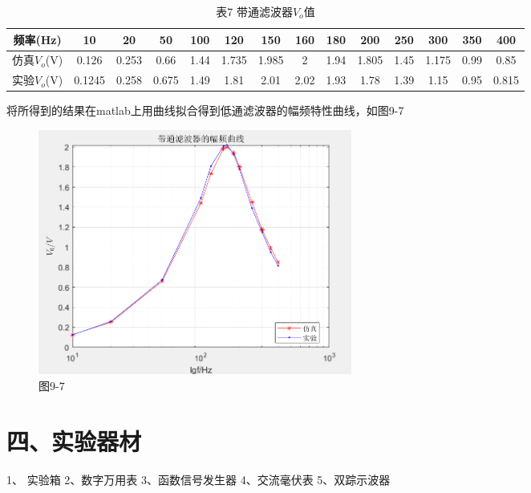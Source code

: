 \documentclass[a4paper,10pt,notitlepage]{article}
\begin{document}
\begin{enumerate}
\begin{table}[h]
\begin{tabular}{|c|c|c|c|c|c|c|c|c|c|c|c|c|c|}
			\hline
			频率(Hz) & 10 & 20 & 50 & 100 & 120 & 150 & 160 & 180 & 200 & 250 & 300 & 350 & 400 \\
			\hline
			仿真$V_o$(V) & 0.126 & 0.253 & 0.66 & 1.44 & 1.735 & 1.985 & 2 & 1.94 & 1.805 & 1.45 & 1.175 & 0.99 & 0.85 \\
			\hline 
			实验$V_o$(V) & 0.1245 & 0.258 & 0.675 & 1.49 & 1.81 & 2.01 & 2.02 & 1.93 & 1.78 & 1.39 & 1.15 & 0.95 & 0.815 \\
			\hline
		\end{tabular}
		\caption*{表7 带通滤波器$V_o$值}
	\end{table}
	将所得到的结果在matlab上用曲线拟合得到低通滤波器的幅频特性曲线，如图9-7
	\begin{figure}[h]
		\centering
		\includegraphics[width=0.5\textwidth]{7.png}
		\caption*{图9-7}
	\end{figure}
\end{enumerate}
\section*{四、实验器材}
1、 实验箱 2、数字万用表 3、函数信号发生器 4、交流毫伏表
5、双踪示波器
\end{document}
